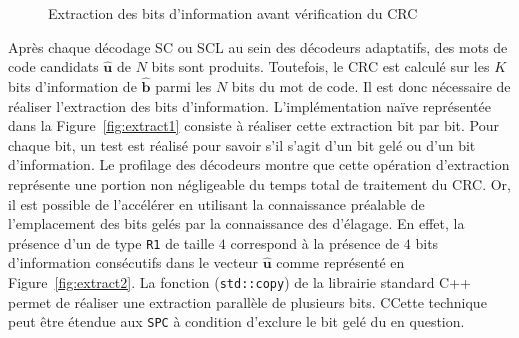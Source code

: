 \begin{figure}[t]
  \centering
  \quad
  \caption{Extraction des bits d'information avant vérification du CRC}
  \label{fig:extract}
\end{figure}

Après chaque décodage SC ou SCL au sein des décodeurs adaptatifs, des mots de code candidats $\mathbold{\hat{u}}$ de $N$ bits sont produits.
Toutefois, le CRC est calculé sur les $K$ bits d'information de $\mathbold{\hat{b}}$ parmi les $N$ bits du mot de code.
Il est donc nécessaire de réaliser l'extraction des bits d'information.
L'implémentation naïve représentée dans la Figure~\ref{fig:extract1} consiste à réaliser cette extraction bit par bit.
Pour chaque bit, un test est réalisé pour savoir s'il s'agit d'un bit gelé ou d'un bit d'information.
Le profilage des décodeurs montre que cette opération d'extraction représente une portion non négligeable du temps total de traitement du CRC.
Or, il est possible de l'accélérer en utilisant la connaissance préalable de l'emplacement des bits gelés par la connaissance des \noeuds d'élagage.
En effet, la présence d'un \noeud de type \texttt{R1} de taille $4$ correspond à la présence de $4$ bits d'information consécutifs dans le vecteur $\mathbold{\hat{u}}$ comme représenté en Figure~\ref{fig:extract2}.
La fonction (\texttt{std::copy}) de la librairie standard C++ permet de réaliser une extraction parallèle de plusieurs bits.
CCette technique peut être étendue aux \noeuds \texttt{SPC} à condition d'exclure le bit gelé du \noeud en question.

